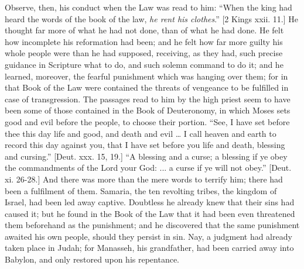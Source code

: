 Observe, then, his conduct when the Law was read to him: ``When
the king had heard the words of the book of the law, \emph{he rent his
clothes}.'' [2 Kings xxii. 11.] He thought far more of what he
had not done, than of what he had done. He felt how incomplete his
reformation had been; and he felt how far more guilty his whole people
were than he had supposed, receiving, as they had, such precise
guidance in Scripture what to do, and such solemn command to do it;
and he learned, moreover, the fearful punishment which was hanging
over them; for in that Book of the Law were contained the threats of
vengeance to be fulfilled in case of transgression. The passages read
to him by the high priest seem to have been some of those contained in
the Book of Deuteronomy, in which Moses sets good and evil before the
people, to choose their portion. ``See, I have set before thee
this day life and good, and death and evil … I call heaven and earth
to record this day against you, that I have set before you life and
death, blessing and cursing.'' [Deut. xxx. 15, 19.] ``A
blessing and a curse; a blessing if ye obey the commandments of the
Lord your God: ... a curse if ye will not obey.'' [Deut. xi.
26-28.] And there was more than the mere words to terrify him; there
had been a fulfilment of them. Samaria, the ten revolting tribes, the
kingdom of Israel, had been led away captive. Doubtless he already
knew that their sins had caused it; but he found in the Book of the
Law that it had been even threatened them beforehand as the
punishment; and he discovered that the same punishment awaited his own
people, should they persist in sin. Nay, a judgment had already taken
place in Judah; for Manasseh, his grandfather, had been carried away
into Babylon, and only restored upon his repentance.

